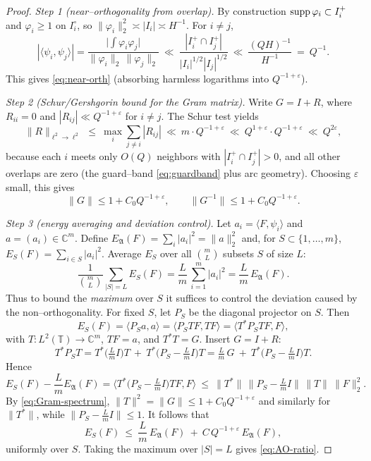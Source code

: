 \begin{proof}
\textit{Step 1 (near--orthogonality from overlap).}
By construction $\operatorname{supp}\varphi_i\subset I_i^+$ and $\varphi_i\ge 1$ on $I_i^\circ$, so $\|\varphi_i\|_2^2\asymp |I_i|\asymp H^{-1}$. For $i\neq j$,
\[
|\langle\psi_i,\psi_j\rangle|
=\frac{\big|\int \varphi_i\varphi_j\big|}{\|\varphi_i\|_2\,\|\varphi_j\|_2}
\ \ll\ \frac{|I_i^+\cap I_j^+|}{|I_i|^{1/2}|I_j|^{1/2}}
\ \ll\ \frac{(QH)^{-1}}{H^{-1}}\ =\ Q^{-1}.
\]
This gives \eqref{eq:near-orth} (absorbing harmless logarithms into $Q^{-1+\varepsilon}$).

\smallskip
\textit{Step 2 (Schur/Gershgorin bound for the Gram matrix).}
Write $G=I+R$, where $R_{ii}=0$ and $|R_{ij}|\ll Q^{-1+\varepsilon}$ for $i\ne j$. The Schur test yields
\[
\|R\|_{\ell^2\to \ell^2}\ \le\ \max_i\sum_{j\ne i}|R_{ij}|
\ \ll\ m\cdot Q^{-1+\varepsilon}\ \ll\ Q^{1+\varepsilon}\cdot Q^{-1+\varepsilon}\ \ll\ Q^{2\varepsilon},
\]
because each $i$ meets only $O(Q)$ neighbors with $|I_i^+\cap I_j^+|>0$, and all other overlaps are zero (the guard--band \eqref{eq:guardband} plus arc geometry). Choosing $\varepsilon$ small, this gives
\begin{equation}\label{eq:Gram-spectrum}
\|G\|\le 1+C_0Q^{-1+\varepsilon},\qquad
\|G^{-1}\|\le 1+C_0Q^{-1+\varepsilon}.
\end{equation}

\smallskip
\textit{Step 3 (energy averaging and deviation control).}
Let $a_i=\langle F,\psi_i\rangle$ and $a=(a_i)\in\mathbb C^m$. Define $E_{\mathfrak A}(F)=\sum_{i}|a_i|^2=\|a\|_2^2$ and, for $S\subset\{1,\dots,m\}$, $E_S(F)=\sum_{i\in S}|a_i|^2$.
Average $E_S$ over all $\binom{m}{L}$ subsets $S$ of size $L$:
\[
\frac{1}{\binom{m}{L}}\sum_{|S|=L} E_S(F)
= \frac{L}{m}\, \sum_{i=1}^m |a_i|^2
=\frac{L}{m}\,E_{\mathfrak A}(F).
\]
Thus to bound the \emph{maximum} over $S$ it suffices to control the deviation caused by the non–orthogonality. For fixed $S$, let $P_S$ be the diagonal projector on $S$. Then
\[
E_S(F) = \langle P_S a,a\rangle = \langle P_S T F, T F\rangle
= \langle T^\ast P_S T F, F\rangle,
\]
with $T:L^2(\mathbb T)\to \mathbb C^m$, $TF=a$, and $T^\ast T=G$. Insert $G=I+R$:
\[
T^\ast P_S T = T^\ast \Big(\tfrac{L}{m}I\Big) T\ +\ T^\ast\Big(P_S-\tfrac{L}{m}I\Big)T
= \tfrac{L}{m}\,G\ +\ T^\ast\Big(P_S-\tfrac{L}{m}I\Big)T.
\]
Hence
\[
E_S(F) - \frac{L}{m}E_{\mathfrak A}(F)
= \langle T^\ast\Big(P_S-\tfrac{L}{m}I\Big)T F, F\rangle
\ \le\ \|T^\ast\|\,\Big\|P_S-\tfrac{L}{m}I\Big\|\,\|T\|\ \|F\|_2^2.
\]
By \eqref{eq:Gram-spectrum}, $\|T\|^2=\|G\|\le 1+C_0Q^{-1+\varepsilon}$ and similarly for $\|T^\ast\|$, while $\|P_S-\tfrac{L}{m}I\|\le 1$. It follows that
\[
E_S(F) \ \le\ \frac{L}{m}\,E_{\mathfrak A}(F)\ +\ C\,Q^{-1+\varepsilon}\,E_{\mathfrak A}(F),
\]
uniformly over $S$. Taking the maximum over $|S|=L$ gives \eqref{eq:AO-ratio}.
\end{proof}

